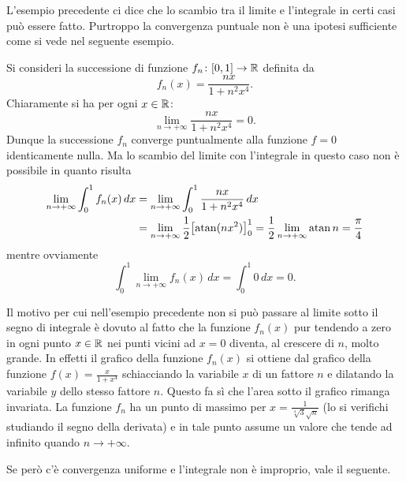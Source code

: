 L'esempio precedente ci dice che lo scambio tra il limite e l'integrale in certi casi 
può essere fatto. Purtroppo la convergenza puntuale non è una ipotesi sufficiente 
come si vede nel seguente esempio.

\begin{example}
Si consideri la successione di funzione $f_n\colon[0,1]\to{\mathbb R}$ definita da 
\[
 f_n(x) = \frac{nx}{1+n^2x^4}.  
\]
Chiaramente si ha per ogni $x\in {\mathbb R}$:
\[
  \lim_{n\to+\infty} \frac{nx}{1+n^2x^4} = 0.
\]
Dunque la successione $f_n$ converge puntualmente alla funzione $f=0$ identicamente nulla.
Ma lo scambio del limite con l'integrale in questo caso 
non è possibile in quanto risulta 
\begin{align*}
\lim_{n\to +\infty} \int_0^1 f_n(x)\, dx 
&= \lim_{n\to +\infty} \int_0^1 \frac{nx}{1+n^2x^4}\, dx \\
&=\lim_{n\to +\infty} \frac 1 2 {\left[ \operatorname{atan}(nx^2) \right]}_0^1 
 = \frac 1 2 \lim_{n\to +\infty} \operatorname{atan} n = \frac \pi 4 
\end{align*}
mentre ovviamente 
\[
 \int_0^1 \lim_{n\to +\infty} f_n(x)\, dx = \int_0^1 0\, dx = 0.
\]
\end{example}

Il motivo per cui nell'esempio precedente non si può passare 
al limite sotto il segno di integrale è dovuto al fatto che la funzione 
$f_n(x)$ pur tendendo a zero in ogni punto $x\in {\mathbb R}$ nei punti vicini 
ad $x=0$ diventa, al crescere di $n$, molto grande.
In effetti il grafico della funzione $f_n(x)$ si ottiene dal grafico 
della funzione $f(x) = \frac{x}{1+x^4}$ schiacciando la variabile $x$ 
di un fattore $n$ e dilatando la variabile $y$ dello stesso fattore $n$.
Questo fa sì che l'area sotto il grafico rimanga invariata.
La funzione $f_n$ ha un punto di massimo per $x=\frac{1}{\sqrt[4]3 \sqrt n}$
(lo si verifichi studiando il segno della derivata) e in tale 
punto assume un valore che tende ad infinito quando $n\to +\infty$.

Se però c'è convergenza uniforme e l'integrale non è improprio, 
vale il seguente.

